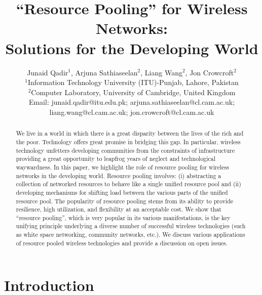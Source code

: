 \documentclass{sigcomm-alternate}
\begin{document}
\title{``Resource Pooling'' for Wireless Networks: \\Solutions for the Developing World}
\author{\large Junaid Qadir$^{1}$, Arjuna Sathiaseelan$^{2}$, Liang Wang$^{2}$, Jon Crowcroft$^{2}$\\
\normalsize $^{1}$Information Technology University (ITU)-Punjab, Lahore, Pakistan\\
\normalsize $^{2}$Computer Laboratory, University of Cambridge, United Kingdom\\
\normalsize Email: junaid.qadir@itu.edu.pk; arjuna.sathiaseelan@cl.cam.ac.uk; liang.wang@cl.cam.ac.uk; jon.crowcroft@cl.cam.ac.uk\\}
\maketitle

\begin{abstract}

We live in a world in which there is a great disparity between the lives of the rich and the poor. Technology offers great promise in bridging this gap. In particular, wireless technology unfetters developing communities from the constraints of infrastructure providing a great opportunity to leapfrog years of neglect and technological waywardness. In this paper, we highlight the role of resource pooling for wireless networks in the developing world. Resource pooling involves: (i) abstracting a collection of networked resources to behave like a single unified resource pool and (ii) developing mechanisms for shifting load between the various parts of the unified resource pool. The popularity of resource pooling stems from its ability to provide resilience, high utilization,  and flexibility at an acceptable cost. We show that ``resource pooling'', which is very popular in its various manifestations, is the key unifying principle underlying a diverse number of successful wireless technologies (such as white space networking, community networks, etc.). We discuss various applications of resource pooled wireless technologies and provide a discussion on open issues.

\end{abstract}

\section{Introduction}
\end{document}
